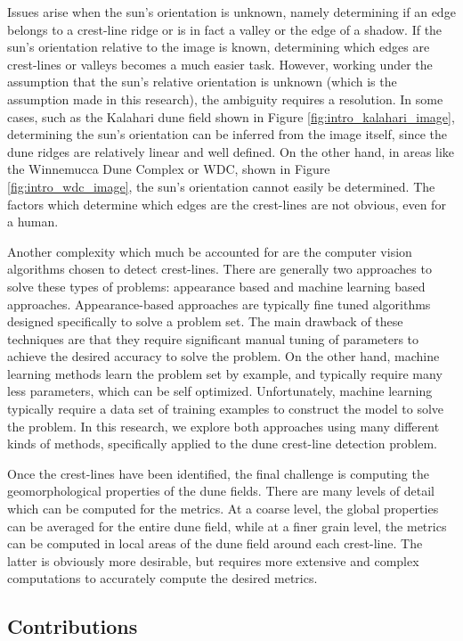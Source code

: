 Issues arise when the sun's orientation is unknown, namely determining if an edge belongs to a crest-line ridge or is in fact a valley or the edge of a shadow. If the sun's orientation relative to the image is known, determining which edges are crest-lines or valleys becomes a much easier task. However, working under the assumption that the sun's relative orientation is unknown (which is the assumption made in this research), the ambiguity requires a resolution. In some cases, such as the Kalahari dune field shown in Figure \ref{fig:intro_kalahari_image}, determining the sun's orientation can be inferred from the image itself, since the dune ridges are relatively linear and well defined. On the other hand, in areas like the Winnemucca Dune Complex or WDC, shown in Figure \ref{fig:intro_wdc_image}, the sun's orientation cannot easily be determined. The factors which determine which edges are the crest-lines are not obvious, even for a human.

Another complexity which much be accounted for are the computer vision algorithms chosen to detect crest-lines. There are generally two approaches to solve these types of problems: appearance based and machine learning based approaches. Appearance-based approaches are typically fine tuned algorithms designed specifically to solve a problem set. The main drawback of these techniques are that they require significant manual tuning of parameters to achieve the desired accuracy to solve the problem. On the other hand, machine learning methods learn the problem set by example, and typically require many less parameters, which can be self optimized. Unfortunately, machine learning typically require a data set of training examples to construct the model to solve the problem. In this research, we explore both approaches using many different kinds of methods, specifically applied to the dune crest-line detection problem.

Once the crest-lines have been identified, the final challenge is computing the geomorphological properties of the dune fields. There are many levels of detail which can be computed for the metrics. At a coarse level, the global properties can be averaged for the entire dune field, while at a finer grain level, the metrics can be computed in local areas of the dune field around each crest-line. The latter is obviously more desirable, but requires more extensive and complex computations to accurately compute the desired metrics.

\subsection{Contributions}


